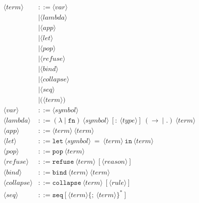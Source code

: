 \documentclass[12pt,oneside,openany]{book}
\theoremstyle{spherepop}
\theoremstyle{remarkstyle}
\begin{document}
\begin{align*}
\langle \mathit{term} \rangle
  &::= \langle \mathit{var} \rangle\\
    &\mid \langle \mathit{lambda} \rangle\\
    &\mid \langle \mathit{app} \rangle\\
    &\mid \langle \mathit{let} \rangle\\
    &\mid \langle \mathit{pop} \rangle\\
    &\mid \langle \mathit{refuse} \rangle\\
    &\mid \langle \mathit{bind} \rangle\\
    &\mid \langle \mathit{collapse} \rangle\\
    &\mid \langle \mathit{seq} \rangle\\
    &\mid \texttt{(}\langle \mathit{term} \rangle\texttt{)}
\\[4pt]
\langle \mathit{var} \rangle
  &::= \langle \mathit{symbol} \rangle
\\[4pt]
\langle \mathit{lambda} \rangle
  &::= (\lambda \mid \mathtt{fn})\ 
       \langle \mathit{symbol} \rangle\ 
       [\mathtt{:}\ \langle \mathit{type} \rangle]\ 
       (\mathtt{\to} \mid \mathtt{.})\ 
       \langle \mathit{term} \rangle
\\[4pt]
\langle \mathit{app} \rangle
  &::= \langle \mathit{term} \rangle\ \langle \mathit{term} \rangle
\\[4pt]
\langle \mathit{let} \rangle
  &::= \mathtt{let}\ \langle \mathit{symbol} \rangle\ \mathtt{=}\
       \langle \mathit{term} \rangle\ \mathtt{in}\ \langle \mathit{term} \rangle
\\[4pt]
\langle \mathit{pop} \rangle
  &::= \mathtt{pop}\ \langle \mathit{term} \rangle
\\[4pt]
\langle \mathit{refuse} \rangle
  &::= \mathtt{refuse}\ \langle \mathit{term} \rangle\ 
       [\langle \mathit{reason} \rangle]
\\[4pt]
\langle \mathit{bind} \rangle
  &::= \mathtt{bind}\ \langle \mathit{term} \rangle\ \langle \mathit{term} \rangle
\\[4pt]
\langle \mathit{collapse} \rangle
  &::= \mathtt{collapse}\ \langle \mathit{term} \rangle\ 
       [\langle \mathit{rule} \rangle]
\\[4pt]
\langle \mathit{seq} \rangle
  &::= \mathtt{seq}\ \mathtt{[}\
       \langle \mathit{term} \rangle
       \{\mathtt{;}\ \langle \mathit{term} \rangle\}^{*}\ 
       \mathtt{]}
\end{align*}
\end{document}
